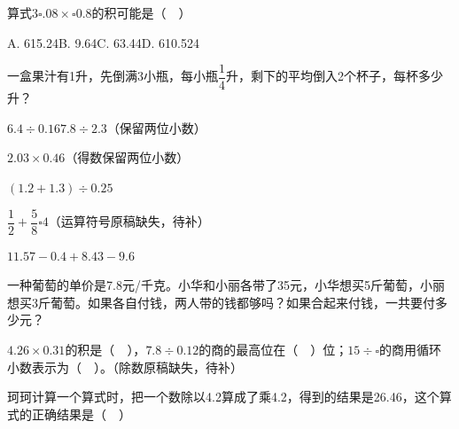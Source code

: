 \vspace{5cm}
\begin{mistake}
算式$3\square.08\times\square0.8$的积可能是（$\quad$）

A. 615.24\quad B. 9.64\quad C. 63.44\quad D. 610.524
\end{mistake}

\vspace{5cm}
\begin{mistake}
一盒果汁有1升，先倒满3小瓶，每小瓶$\dfrac{1}{4}$升，剩下的平均倒入2个杯子，每杯多少升？
\end{mistake}

\vspace{5cm}
\begin{mistake}
$6.4\div0.16$\quad $7.8\div2.3$（保留两位小数）
\end{mistake}

\vspace{5cm}
\begin{mistake}
$2.03\times0.46$（得数保留两位小数）
\end{mistake}

\vspace{5cm}
\begin{mistake}
$(1.2+1.3)\div0.25$
\end{mistake}

\vspace{5cm}
\begin{mistake}
$\dfrac{1}{2}+\dfrac{5}{8}\square4$（运算符号原稿缺失，待补）
\end{mistake}

\vspace{5cm}
\begin{mistake}
$11.57-0.4+8.43-9.6$
\end{mistake}

\vspace{5cm}
\begin{mistake}
一种葡萄的单价是7.8元/千克。小华和小丽各带了35元，小华想买5斤葡萄，小丽想买3斤葡萄。如果各自付钱，两人带的钱都够吗？如果合起来付钱，一共要付多少元？
\end{mistake}

\vspace{5cm}
\begin{mistake}
$4.26\times0.31$的积是（$\quad$），$7.8\div0.12$的商的最高位在（$\quad$）位；$15\div\square$的商用循环小数表示为（$\quad$）。（除数原稿缺失，待补）
\end{mistake}

\vspace{5cm}
\begin{mistake}
珂珂计算一个算式时，把一个数除以4.2算成了乘4.2，得到的结果是26.46，这个算式的正确结果是（$\quad$）
\end{mistake}


